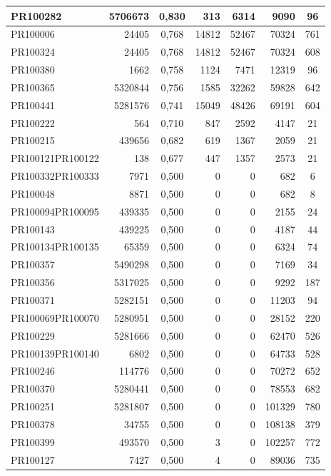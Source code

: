 \begin{center}
\begin{longtable}{lr|c|rrr|c}
	PR100282 & 5706673 & 0,830 & 313 & 6314 & 9090 & 96 \\ \hline
	PR100006 & 24405 & 0,768 & 14812 & 52467 & 70324 & 761 \\ \hline
	PR100324 & 24405 & 0,768 & 14812 & 52467 & 70324 & 608 \\ \hline
	PR100380 & 1662 & 0,758 & 1124 & 7471 & 12319 & 96 \\ \hline
	PR100365 & 5320844 & 0,756 & 1585 & 32262 & 59828 & 642 \\ \hline
	PR100441 & 5281576 & 0,741 & 15049 & 48426 & 69191 & 604 \\ \hline
	PR100222 & 564 & 0,710 & 847 & 2592 & 4147 & 21 \\ \hline
	PR100215 & 439656 & 0,682 & 619 & 1367 & 2059 & 21 \\ \hline
	PR100121PR100122 & 138 & 0,677 & 447 & 1357 & 2573 & 21 \\ \hline
	PR100332PR100333 & 7971 & 0,500 & 0 & 0 & 682 & 6 \\ \hline
	PR100048 & 8871 & 0,500 & 0 & 0 & 682 & 8 \\ \hline
	PR100094PR100095 & 439335 & 0,500 & 0 & 0 & 2155 & 24 \\ \hline
	PR100143 & 439225 & 0,500 & 0 & 0 & 4187 & 44 \\ \hline
	PR100134PR100135 & 65359 & 0,500 & 0 & 0 & 6324 & 74 \\ \hline
	PR100357 & 5490298 & 0,500 & 0 & 0 & 7169 & 34 \\ \hline
	PR100356 & 5317025 & 0,500 & 0 & 0 & 9292 & 187 \\ \hline
	PR100371 & 5282151 & 0,500 & 0 & 0 & 11203 & 94 \\ \hline
	PR100069PR100070 & 5280951 & 0,500 & 0 & 0 & 28152 & 220 \\ \hline
	PR100229 & 5281666 & 0,500 & 0 & 0 & 62470 & 526 \\ \hline
	PR100139PR100140 & 6802 & 0,500 & 0 & 0 & 64733 & 528 \\ \hline
	PR100246 & 114776 & 0,500 & 0 & 0 & 70272 & 652 \\ \hline
	PR100370 & 5280441 & 0,500 & 0 & 0 & 78553 & 682 \\ \hline
	PR100251 & 5281807 & 0,500 & 0 & 0 & 101329 & 780 \\ \hline
	PR100378 & 34755 & 0,500 & 0 & 0 & 108138 & 379 \\ \hline
	PR100399 & 493570 & 0,500 & 3 & 0 & 102257 & 772 \\ \hline
	PR100127 & 7427 & 0,500 & 4 & 0 & 89036 & 735 \\ \hline

\end{longtable}
\end{center}
